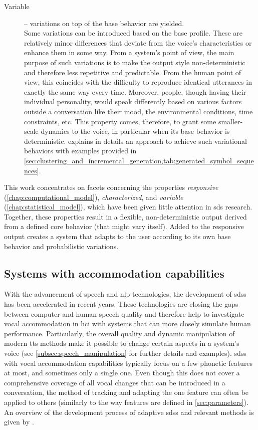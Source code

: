 \begin{description}
	\item[Variable] -- variations on top of the base behavior are yielded.\\
	Some variations can be introduced based on the base profile.
	These are relatively minor differences that deviate from the voice's characteristics or enhance them in some way.
	From a system's point of view, the main purpose of such variations is to make the output style non-deterministic and therefore less repetitive and predictable.
	From the human point of view, this coincides with the difficulty to reproduce identical utterances in exactly the same way every time.
	Moreover, people, though having their individual personality, would speak differently based on various factors outside a conversation like their mood, the environmental conditions, time constraints, etc.
	This property comes, therefore, to grant some smaller-scale dynamics to the voice, in particular when its base behavior is deterministic.
	 explains in details an approach to achieve such variational behaviors with examples provided in \cref{sec:clustering_and_incremental_generation,tab:generated_symbol_sequences}.
\end{description}
%

This work concentrates on facets concerning the properties \emph{responsive} (\cref{chap:computational_model}), \emph{characterized}, and \emph{variable} (\cref{chap:statistical_model}), which have been given little attention in \ac{sds} research.
Together, these properties result in a flexible, non-deterministic output derived from a defined core behavior (that might vary itself).
Added to the responsive output creates a system that adapts to the user according to its own base behavior and probabilistic variations.

\subsection{Systems with accommodation capabilities}
\label{subsec:systems_with_accommodation_capabilities}

With the advancement of speech and \ac{nlp} technologies, the development of \acp{sds} has been accelerated in recent years.
These technologies are closing the gaps between computer and human speech quality and therefore help to investigate vocal accommodation in \ac{hci} with systems that can more closely simulate human performance.
Particularly, the overall quality and dynamic manipulation of modern \ac{tts} methods make it possible to change certain aspects in a system's voice (see \cref{subsec:speech_manipulation} for further details and examples).
\Acp{sds} with vocal accommodation capabilities typically focus on a few phonetic features at most, and sometimes only a single one.
Even though this does not cover a comprehensive coverage of all vocal changes that can be introduced in a conversation, the method of tracking and adapting the one feature can often be applied to others (similarly to the way features are defined in \cref{sec:parameters}).
An overview of the development process of adaptive \acp{sds} and relevant methods is given by \citet{Levitan2020developing, Bernsen1998designing}.

